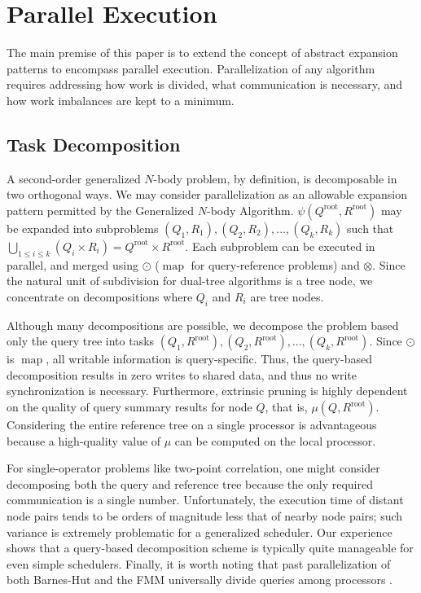 \documentclass[twoside,leqno,twocolumn]{article}
\newcommand{\Union}{\bigcup}
\DeclareMathOperator*{\map}{map}
\newcommand{\gnp}{\psi}
\newcommand{\kdroot}[1]{#1^{\text{root}}}
\newcommand{\lettermu}{\mu}
\newcommand{\inmu}{\mu}
\begin{document}
\section{Parallel Execution}

The main premise of this paper is to extend the concept of abstract expansion patterns to encompass parallel execution.
Parallelization of any algorithm requires addressing how work is divided, what communication is necessary, and how work imbalances are kept to a minimum.

\subsection{Task Decomposition}

A second-order generalized $N$-body problem, by definition, is decomposable in two orthogonal ways.
We may consider parallelization as an allowable expansion pattern permitted by the Generalized $N$-body Algorithm.
$\gnp(\kdroot{Q}, \kdroot{R})$ may be expanded into subproblems $(Q_1,R_1), (Q_2,R_2), ..., (Q_k, R_k)$ such that $\Union_{1 \leq i \leq k} (Q_i \times R_i) = \kdroot{Q} \times \kdroot{R}$.
Each subproblem can be executed in parallel, and merged using $\odot$ ($\map$ for query-reference problems) and $\otimes$.
Since the natural unit of subdivision for dual-tree algorithms is a tree node, we concentrate on decompositions where $Q_i$ and $R_i$ are tree nodes.

Although many decompositions are possible, we decompose the problem based only the query tree into tasks $(Q_1, \kdroot{R}), (Q_2, \kdroot{R}), ..., (Q_k, \kdroot{R})$.
Since $\odot$ is $\map$, all writable information is query-specific.
Thus, the query-based decomposition results in zero writes to shared data, and thus no write synchronization is necessary.
Furthermore, extrinsic pruning is highly dependent on the quality of query summary results for node $Q$, that is, $\inmu(Q, \kdroot{R})$.
Considering the entire reference tree on a single processor is advantageous because a high-quality value of $\lettermu$ can be computed on the local processor.

For single-operator problems like two-point correlation, one might consider decomposing both the query and reference tree because the only required communication is a single number.
Unfortunately, the execution time of distant node pairs tends to be orders of magnitude less that of nearby node pairs; such variance is extremely problematic for a generalized scheduler.
Our experience shows that a query-based decomposition scheme is typically quite manageable for even simple schedulers.
Finally, it is worth noting that past parallelization of both Barnes-Hut and the FMM universally divide queries among processors \cite{salmon_thesis, singh_thesis, liu94experiences}.
\end{document}
